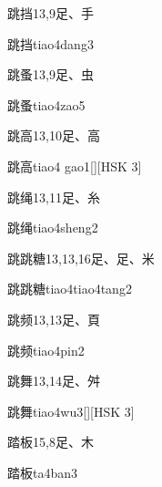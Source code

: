 \begin{entry}{跳挡}{13,9}{⾜、⼿}
  \begin{phonetics}{跳挡}{tiao4dang3}
  \end{phonetics}
\end{entry}

\begin{entry}{跳蚤}{13,9}{⾜、⾍}
  \begin{phonetics}{跳蚤}{tiao4zao5}
  \end{phonetics}
\end{entry}

\begin{entry}{跳高}{13,10}{⾜、⾼}
  \begin{phonetics}{跳高}{tiao4 gao1}[][HSK 3]
  \end{phonetics}
\end{entry}

\begin{entry}{跳绳}{13,11}{⾜、⽷}
  \begin{phonetics}{跳绳}{tiao4sheng2}
  \end{phonetics}
\end{entry}

\begin{entry}{跳跳糖}{13,13,16}{⾜、⾜、⽶}
  \begin{phonetics}{跳跳糖}{tiao4tiao4tang2}
  \end{phonetics}
\end{entry}

\begin{entry}{跳频}{13,13}{⾜、⾴}
  \begin{phonetics}{跳频}{tiao4pin2}
  \end{phonetics}
\end{entry}

\begin{entry}{跳舞}{13,14}{⾜、⾇}
  \begin{phonetics}{跳舞}{tiao4wu3}[][HSK 3]
  \end{phonetics}
\end{entry}

\begin{entry}{踏板}{15,8}{⾜、⽊}
  \begin{phonetics}{踏板}{ta4ban3}
  \end{phonetics}
\end{entry}

